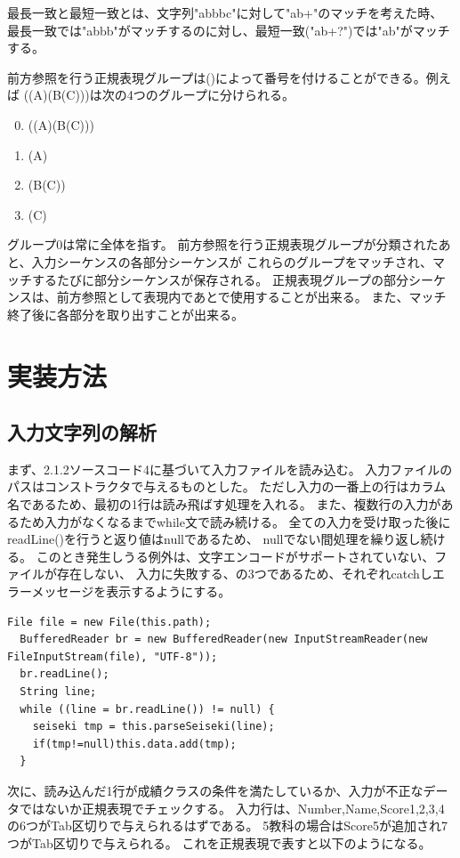 \documentclass[dvipdfmx]{jsarticle}
\begin{document}
最長一致と最短一致とは、文字列"abbbc"に対して"ab+"のマッチを考えた時、
最長一致では"abbb"がマッチするのに対し、最短一致("ab+?")では"ab"がマッチする。

前方参照を行う正規表現グループは()によって番号を付けることができる。例えば
((A)(B(C)))は次の4つのグループに分けられる。
\begin{enumerate}
  \setcounter{enumi}{-1}
  \item ((A)(B(C)))
  \item (A)
  \item (B(C))
  \item (C)
\end{enumerate}

グループ0は常に全体を指す。
前方参照を行う正規表現グループが分類されたあと、入力シーケンスの各部分シーケンスが
これらのグループをマッチされ、マッチするたびに部分シーケンスが保存される。
正規表現グループの部分シーケンスは、前方参照として表現内であとで使用することが出来る。
また、マッチ終了後に各部分を取り出すことが出来る。


\section{実装方法}
\subsection{入力文字列の解析}

まず、2.1.2ソースコード4に基づいて入力ファイルを読み込む。
入力ファイルのパスはコンストラクタで与えるものとした。
ただし入力の一番上の行はカラム名であるため、最初の1行は読み飛ばす処理を入れる。
また、複数行の入力があるため入力がなくなるまでwhile文で読み続ける。
全ての入力を受け取った後にreadLine()を行うと返り値はnullであるため、
nullでない間処理を繰り返し続ける。
このとき発生しうる例外は、文字エンコードがサポートされていない、ファイルが存在しない、
入力に失敗する、の3つであるため、それぞれcatchしエラーメッセージを表示するようにする。
\begin{lstlisting}[caption=複数行の入力,label=impl1]
  File file = new File(this.path);
  BufferedReader br = new BufferedReader(new InputStreamReader(new FileInputStream(file), "UTF-8"));
  br.readLine();
  String line;
  while ((line = br.readLine()) != null) {
    seiseki tmp = this.parseSeiseki(line);
    if(tmp!=null)this.data.add(tmp);
  }
\end{lstlisting}

次に、読み込んだ1行が成績クラスの条件を満たしているか、入力が不正なデータではないか正規表現でチェックする。
入力行は、Number,Name,Score1,2,3,4の6つがTab区切りで与えられるはずである。
5教科の場合はScore5が追加され7つがTab区切りで与えられる。
これを正規表現で表すと以下のようになる。
\end{document}
